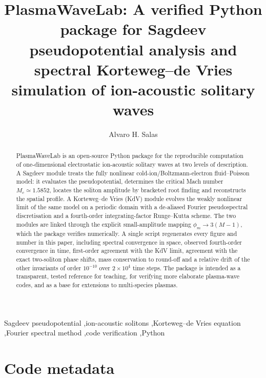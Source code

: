 \documentclass[preprint,12pt]{elsarticle}
\begin{document}
\begin{frontmatter}

\title{PlasmaWaveLab: A verified Python package for Sagdeev pseudopotential
analysis and spectral Korteweg--de Vries simulation of ion-acoustic solitary waves}

\author{Alvaro H. Salas}
\address{FIZMAKO Research Group, Department of Mathematics and Statistics,
Universidad Nacional de Colombia, Sede Manizales, Manizales, Colombia}

\begin{abstract}
PlasmaWaveLab is an open-source Python package for the reproducible computation
of one-dimensional electrostatic ion-acoustic solitary waves at two levels of
description. A Sagdeev module treats the fully nonlinear cold-ion/Boltzmann-electron
fluid--Poisson model: it evaluates the pseudopotential, determines the critical
Mach number $M_c\simeq1.5852$, locates the soliton amplitude by bracketed root
finding and reconstructs the spatial profile. A Korteweg--de Vries (KdV) module
evolves the weakly nonlinear limit of the same model on a periodic domain with a
de-aliased Fourier pseudospectral discretisation and a fourth-order
integrating-factor Runge--Kutta scheme. The two modules are linked through the
explicit small-amplitude mapping $\phi_m\to3(M-1)$, which the package verifies
numerically. A single script regenerates every figure and number in this paper,
including spectral convergence in space, observed fourth-order convergence in
time, first-order agreement with the KdV limit, agreement with the exact
two-soliton phase shifts, mass conservation to round-off and a relative drift
of the other invariants of order $10^{-10}$ over $2\times10^4$ time steps. The package is intended as a transparent,
tested reference for teaching, for verifying more elaborate plasma-wave codes,
and as a base for extensions to multi-species plasmas.
\end{abstract}

\begin{keyword}
Sagdeev pseudopotential \sep ion-acoustic solitons \sep Korteweg--de Vries equation
\sep Fourier spectral method \sep code verification \sep Python
\end{keyword}

\end{frontmatter}

\section*{Code metadata}
\label{sec:metadata}
\end{document}

